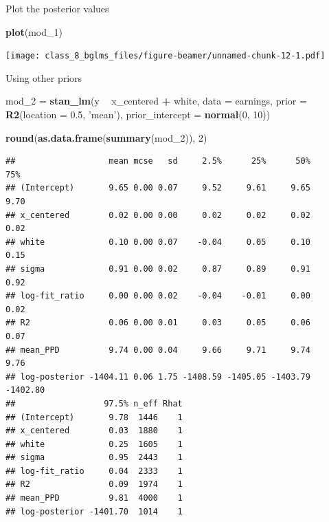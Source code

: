 \documentclass[ignorenonframetext,]{beamer}
\newenvironment{Shaded}{\begin{snugshade}}{\end{snugshade}}
\newcommand{\KeywordTok}[1]{\textcolor[rgb]{0.13,0.29,0.53}{\textbf{#1}}}
\newcommand{\DataTypeTok}[1]{\textcolor[rgb]{0.13,0.29,0.53}{#1}}
\newcommand{\DecValTok}[1]{\textcolor[rgb]{0.00,0.00,0.81}{#1}}
\newcommand{\FloatTok}[1]{\textcolor[rgb]{0.00,0.00,0.81}{#1}}
\newcommand{\StringTok}[1]{\textcolor[rgb]{0.31,0.60,0.02}{#1}}
\newcommand{\OperatorTok}[1]{\textcolor[rgb]{0.81,0.36,0.00}{\textbf{#1}}}
\newcommand{\NormalTok}[1]{#1}
\begin{document}
\begin{frame}[fragile]{Plot the posterior values}

\begin{Shaded}
\begin{Highlighting}[]
\KeywordTok{plot}\NormalTok{(mod_}\DecValTok{1}\NormalTok{)}
\end{Highlighting}
\end{Shaded}

\texttt{[image: class\_8\_bglms\_files/figure-beamer/unnamed-chunk-12-1.pdf]}

\end{frame}

\begin{frame}[fragile]{Using other priors}

\tiny

\begin{Shaded}
\begin{Highlighting}[]
\NormalTok{mod_}\DecValTok{2}\NormalTok{ =}\StringTok{ }\KeywordTok{stan_lm}\NormalTok{(y }\OperatorTok{~}\StringTok{ }\NormalTok{x_centered }\OperatorTok{+}\StringTok{ }\NormalTok{white, }\DataTypeTok{data =}\NormalTok{ earnings,}
                \DataTypeTok{prior =} \KeywordTok{R2}\NormalTok{(}\DataTypeTok{location =} \FloatTok{0.5}\NormalTok{, }\StringTok{'mean'}\NormalTok{),}
                \DataTypeTok{prior_intercept =} \KeywordTok{normal}\NormalTok{(}\DecValTok{0}\NormalTok{, }\DecValTok{10}\NormalTok{))}
\end{Highlighting}
\end{Shaded}

\begin{Shaded}
\begin{Highlighting}[]
\KeywordTok{round}\NormalTok{(}\KeywordTok{as.data.frame}\NormalTok{(}\KeywordTok{summary}\NormalTok{(mod_}\DecValTok{2}\NormalTok{)), }\DecValTok{2}\NormalTok{)}
\end{Highlighting}
\end{Shaded}

\begin{verbatim}
##                   mean mcse   sd     2.5%      25%      50%      75%
## (Intercept)       9.65 0.00 0.07     9.52     9.61     9.65     9.70
## x_centered        0.02 0.00 0.00     0.02     0.02     0.02     0.02
## white             0.10 0.00 0.07    -0.04     0.05     0.10     0.15
## sigma             0.91 0.00 0.02     0.87     0.89     0.91     0.92
## log-fit_ratio     0.00 0.00 0.02    -0.04    -0.01     0.00     0.02
## R2                0.06 0.00 0.01     0.03     0.05     0.06     0.07
## mean_PPD          9.74 0.00 0.04     9.66     9.71     9.74     9.76
## log-posterior -1404.11 0.06 1.75 -1408.59 -1405.05 -1403.79 -1402.80
##                  97.5% n_eff Rhat
## (Intercept)       9.78  1446    1
## x_centered        0.03  1880    1
## white             0.25  1605    1
## sigma             0.95  2443    1
## log-fit_ratio     0.04  2333    1
## R2                0.09  1974    1
## mean_PPD          9.81  4000    1
## log-posterior -1401.70  1014    1
\end{verbatim}

\end{frame}
\end{document}
